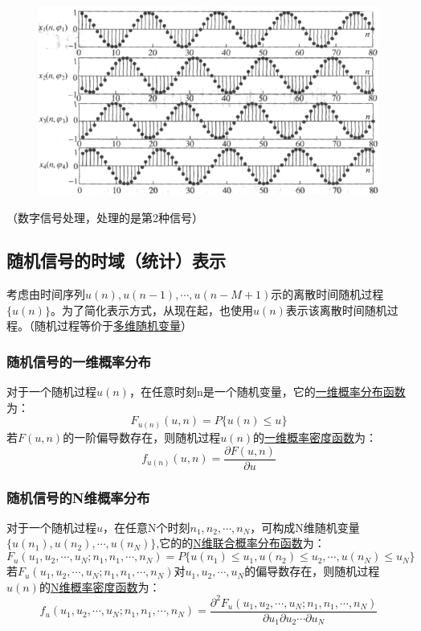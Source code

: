 \documentclass[UTF8]{ctexart} %
\begin{document}
				\begin{figure}[H]
					\centering\includegraphics[scale=0.3]{7.png}
				\end{figure}
				（数字信号处理，处理的是第2种信号）
		\subsection{随机信号的时域（统计）表示}
			考虑由时间序列$u(n),u(n-1),\cdots,u(n-M+1)$示的离散时间随机过程$\{u(n)\}$。为了简化表示方式，从现在起，也使用$u(n)$表示该离散时间随机过程。（随机过程等价于\uline{多维随机变量}）
			\subsubsection{随机信号的一维概率分布}
				对于一个随机过程$u(n)$，在任意时刻n是一个随机变量，它的\uline{一维概率分布函数}为：
				\[F_{u(n)}(u,n)= P\{u(n)\leq u\}\]
				若$F(u,n)$的一阶偏导数存在，则随机过程$u(n)$的\uline{一维概率密度函数}为：
				\[f_{u(n)}(u,n)=\frac{\partial F(u,n)}{\partial u}\]
			\subsubsection{随机信号的N维概率分布}	
				对于一个随机过程$u$，在任意N个时刻$n_1,n_2,\cdots,n_N$，可构成N维随机变量\\
				$\{u(n_1),u(n_2),\cdots ,u(n_N)\}$,它的的\uline{N维联合概率分布函数}为：
				\[F_u(u_1,u_2,\cdots,u_N;n_1,n_1,\cdots,n_N)= P\{u(n_1)\leq u_1,u(n_2)\leq u_2,\cdots, u(n_N)\leq u_N\}\]
				若$F_u(u_1,u_2,\cdots,u_N;n_1,n_1,\cdots,n_N)$对$u_1,u_2,\cdots, u_N$的偏导数存在，则随机过程$u(n)$的\uline{N维概率密度函数}为：
				\[f_u(u_1,u_2,\cdots,u_N;n_1,n_1,\cdots,n_N) = \frac{\partial^2F_u(u_1,u_2,\cdots,u_N;n_1,n_1,\cdots,n_N)}{\partial u_1\partial u_2\cdots\partial u_N}\]
				
\end{document}
